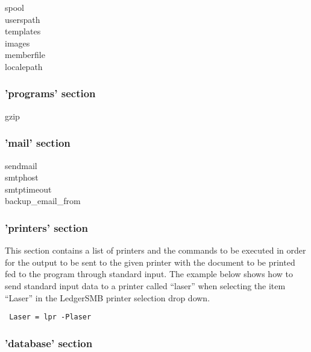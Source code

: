 \begin{description}
\item [spool]
\item [userspath]
\item [templates]
\item [images]
\item [memberfile]
\item [localepath]
\end{description}

\subsubsection{'programs' section}
\label{subsubsec-global-config-ledgersmb-conf-programs}

\begin{description}
\item [gzip]
\end{description}


\subsubsection{'mail' section}
\label{subsubsec-global-config-ledgersmb-conf-mail}

\begin{description}
\item [sendmail]
\item [smtphost]
\item [smtptimeout]
\item [backup\_email\_from]
\end{description}

\subsubsection{'printers' section}
\label{subsubsec-global-config-ledgersmb-conf-printers}

This section contains a list of printers and the commands
to be executed in order for the output to be sent to the given printer with
the document to be printed fed to the program through standard input.
The example below shows how to send standard input data to a printer called ``laser''
when selecting the item ``Laser'' in the LedgerSMB printer selection drop down.

\texttt{
Laser    = lpr -Plaser
}


\subsubsection{'database' section}
\label{subsubsec-global-config-ledgersmb-conf-database}

